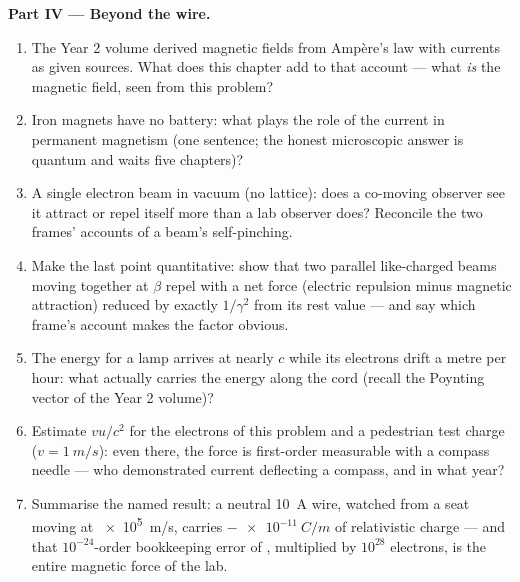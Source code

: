 \begin{problem}
\medskip\noindent\textbf{Part IV --- Beyond the wire.}
\begin{enumerate}[resume]
  \item The Year 2 volume derived magnetic fields from Ampère's
        law with currents as given sources. What does this chapter
        add to that account --- what \emph{is} the magnetic field,
        seen from this problem?
  \item Iron magnets have no battery: what plays the role of the
        current in permanent magnetism (one sentence; the honest
        microscopic answer is quantum and waits five chapters)?
  \item A single electron beam in vacuum (no lattice): does a
        co-moving observer see it attract or repel itself more than
        a lab observer does? Reconcile the two frames' accounts of a
        beam's self-pinching.
  \item Make the last point quantitative: show that two parallel
        like-charged beams moving together at $\beta$ repel with a
        net force (electric repulsion minus magnetic attraction)
        reduced by exactly $1/\gamma^2$ from its rest value --- and
        say which frame's account makes the factor obvious.
  \item The energy for a lamp arrives at nearly $c$ while its
        electrons drift a metre per hour: what actually carries the
        energy along the cord (recall the Poynting vector of the
        Year 2 volume)?
  \item Estimate $vu/c^2$ for the electrons of this problem and a
        pedestrian test charge ($v = \qty{1}{m/s}$): even there, the
        force is first-order measurable with a compass needle ---
        who demonstrated current deflecting a compass, and in what
        year?
  \item Summarise the named result: a neutral \qty{10}{A} wire,
        watched from a seat moving at \qty{e5}{m/s}, carries
        $-\qty{e-11}{C/m}$ of relativistic charge --- and that
        $10^{-24}$-order bookkeeping error of ,
        multiplied by $10^{28}$ electrons, is the entire magnetic
        force of the lab.
\end{enumerate}
\end{problem}
